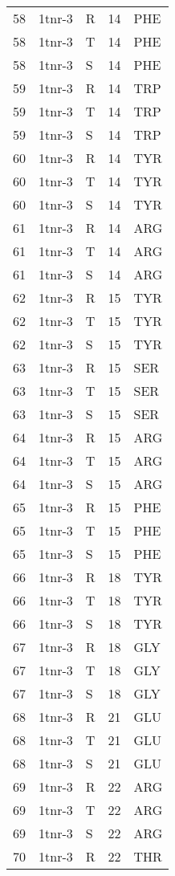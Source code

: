 \begin{tiny}
\begin{longtable}[l]{l|l|l|l|l}
	58 & 1tnr-3 & R & 14 & PHE \\
	58 & 1tnr-3 & T & 14 & PHE \\
	58 & 1tnr-3 & S & 14 & PHE \\
	59 & 1tnr-3 & R & 14 & TRP \\
	59 & 1tnr-3 & T & 14 & TRP \\
	59 & 1tnr-3 & S & 14 & TRP \\
	60 & 1tnr-3 & R & 14 & TYR \\
	60 & 1tnr-3 & T & 14 & TYR \\
	60 & 1tnr-3 & S & 14 & TYR \\
	61 & 1tnr-3 & R & 14 & ARG \\
	61 & 1tnr-3 & T & 14 & ARG \\
	61 & 1tnr-3 & S & 14 & ARG \\
	62 & 1tnr-3 & R & 15 & TYR \\
	62 & 1tnr-3 & T & 15 & TYR \\
	62 & 1tnr-3 & S & 15 & TYR \\
	63 & 1tnr-3 & R & 15 & SER \\
	63 & 1tnr-3 & T & 15 & SER \\
	63 & 1tnr-3 & S & 15 & SER \\
	64 & 1tnr-3 & R & 15 & ARG \\
	64 & 1tnr-3 & T & 15 & ARG \\
	64 & 1tnr-3 & S & 15 & ARG \\
	65 & 1tnr-3 & R & 15 & PHE \\
	65 & 1tnr-3 & T & 15 & PHE \\
	65 & 1tnr-3 & S & 15 & PHE \\
	66 & 1tnr-3 & R & 18 & TYR \\
	66 & 1tnr-3 & T & 18 & TYR \\
	66 & 1tnr-3 & S & 18 & TYR \\
	67 & 1tnr-3 & R & 18 & GLY \\
	67 & 1tnr-3 & T & 18 & GLY \\
	67 & 1tnr-3 & S & 18 & GLY \\
	68 & 1tnr-3 & R & 21 & GLU \\
	68 & 1tnr-3 & T & 21 & GLU \\
	68 & 1tnr-3 & S & 21 & GLU \\
	69 & 1tnr-3 & R & 22 & ARG \\
	69 & 1tnr-3 & T & 22 & ARG \\
	69 & 1tnr-3 & S & 22 & ARG \\
	70 & 1tnr-3 & R & 22 & THR \\

\end{longtable}
\end{tiny}
